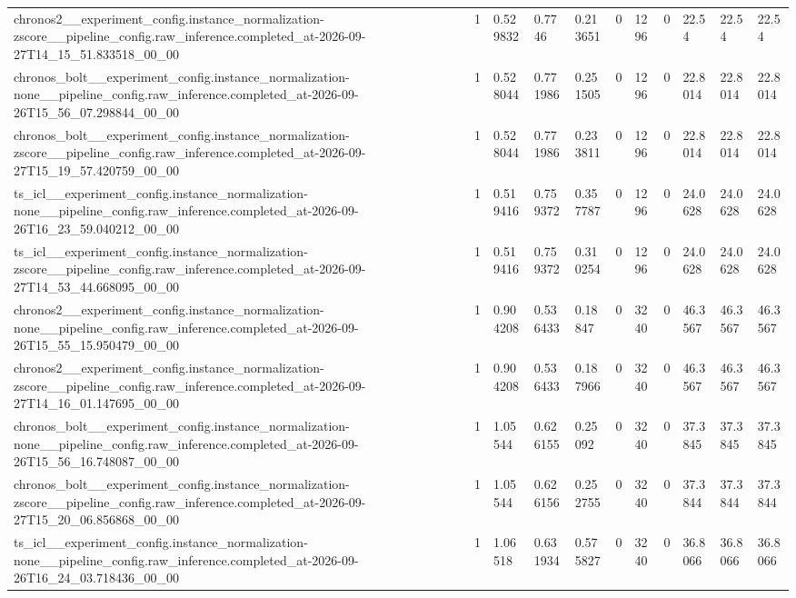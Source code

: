 \begin{tabular}{lllllllllll}
chronos2\_\_experiment\_config.instance\_normalization-zscore\_\_pipeline\_config.raw\_inference.completed\_at-2026-09-27T14\_15\_51.833518\_00\_00 & 1 & 0.529832 & 0.7746 & 0.213651 & 0 & 1296 & 0 & 22.54 & 22.54 & 22.54 \\
chronos\_bolt\_\_experiment\_config.instance\_normalization-none\_\_pipeline\_config.raw\_inference.completed\_at-2026-09-26T15\_56\_07.298844\_00\_00 & 1 & 0.528044 & 0.771986 & 0.251505 & 0 & 1296 & 0 & 22.8014 & 22.8014 & 22.8014 \\
chronos\_bolt\_\_experiment\_config.instance\_normalization-zscore\_\_pipeline\_config.raw\_inference.completed\_at-2026-09-27T15\_19\_57.420759\_00\_00 & 1 & 0.528044 & 0.771986 & 0.233811 & 0 & 1296 & 0 & 22.8014 & 22.8014 & 22.8014 \\
ts\_icl\_\_experiment\_config.instance\_normalization-none\_\_pipeline\_config.raw\_inference.completed\_at-2026-09-26T16\_23\_59.040212\_00\_00 & 1 & 0.519416 & 0.759372 & 0.357787 & 0 & 1296 & 0 & 24.0628 & 24.0628 & 24.0628 \\
ts\_icl\_\_experiment\_config.instance\_normalization-zscore\_\_pipeline\_config.raw\_inference.completed\_at-2026-09-27T14\_53\_44.668095\_00\_00 & 1 & 0.519416 & 0.759372 & 0.310254 & 0 & 1296 & 0 & 24.0628 & 24.0628 & 24.0628 \\
chronos2\_\_experiment\_config.instance\_normalization-none\_\_pipeline\_config.raw\_inference.completed\_at-2026-09-26T15\_55\_15.950479\_00\_00 & 1 & 0.904208 & 0.536433 & 0.18847 & 0 & 3240 & 0 & 46.3567 & 46.3567 & 46.3567 \\
chronos2\_\_experiment\_config.instance\_normalization-zscore\_\_pipeline\_config.raw\_inference.completed\_at-2026-09-27T14\_16\_01.147695\_00\_00 & 1 & 0.904208 & 0.536433 & 0.187966 & 0 & 3240 & 0 & 46.3567 & 46.3567 & 46.3567 \\
chronos\_bolt\_\_experiment\_config.instance\_normalization-none\_\_pipeline\_config.raw\_inference.completed\_at-2026-09-26T15\_56\_16.748087\_00\_00 & 1 & 1.05544 & 0.626155 & 0.25092 & 0 & 3240 & 0 & 37.3845 & 37.3845 & 37.3845 \\
chronos\_bolt\_\_experiment\_config.instance\_normalization-zscore\_\_pipeline\_config.raw\_inference.completed\_at-2026-09-27T15\_20\_06.856868\_00\_00 & 1 & 1.05544 & 0.626156 & 0.252755 & 0 & 3240 & 0 & 37.3844 & 37.3844 & 37.3844 \\
ts\_icl\_\_experiment\_config.instance\_normalization-none\_\_pipeline\_config.raw\_inference.completed\_at-2026-09-26T16\_24\_03.718436\_00\_00 & 1 & 1.06518 & 0.631934 & 0.575827 & 0 & 3240 & 0 & 36.8066 & 36.8066 & 36.8066 \\

\end{tabular}
